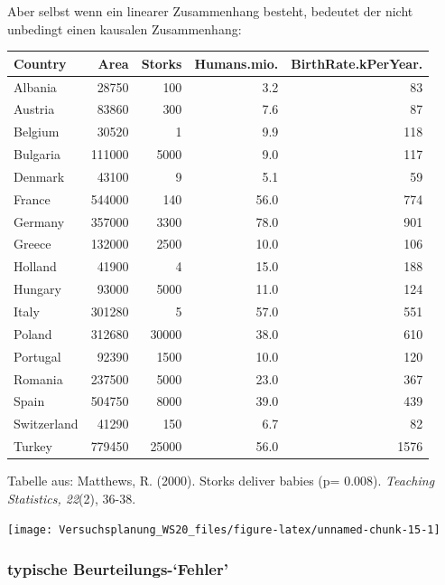 \documentclass[
]{book}
\begin{document}
Aber selbst wenn ein linearer Zusammenhang besteht, bedeutet der nicht unbedingt einen kausalen Zusammenhang:

\begin{tabular}[t]{lrrrr}
\toprule
Country & Area & Storks & Humans.mio. & BirthRate.kPerYear.\\
\midrule
Albania & 28750 & 100 & 3.2 & 83\\
Austria & 83860 & 300 & 7.6 & 87\\
Belgium & 30520 & 1 & 9.9 & 118\\
Bulgaria & 111000 & 5000 & 9.0 & 117\\
Denmark & 43100 & 9 & 5.1 & 59\\
\addlinespace
France & 544000 & 140 & 56.0 & 774\\
Germany & 357000 & 3300 & 78.0 & 901\\
Greece & 132000 & 2500 & 10.0 & 106\\
Holland & 41900 & 4 & 15.0 & 188\\
Hungary & 93000 & 5000 & 11.0 & 124\\
\addlinespace
Italy & 301280 & 5 & 57.0 & 551\\
Poland & 312680 & 30000 & 38.0 & 610\\
Portugal & 92390 & 1500 & 10.0 & 120\\
Romania & 237500 & 5000 & 23.0 & 367\\
Spain & 504750 & 8000 & 39.0 & 439\\
\addlinespace
Switzerland & 41290 & 150 & 6.7 & 82\\
Turkey & 779450 & 25000 & 56.0 & 1576\\
\bottomrule
\end{tabular}

Tabelle aus: Matthews, R. (2000). Storks deliver babies (p= 0.008). \emph{Teaching Statistics, 22}(2), 36-38.

\begin{center}\texttt{[image: Versuchsplanung\_WS20\_files/figure-latex/unnamed-chunk-15-1]} \end{center}

\hypertarget{typische-beurteilungs-fehler}{%
\subsubsection{typische Beurteilungs-`Fehler'}\label{typische-beurteilungs-fehler}}
\end{document}
